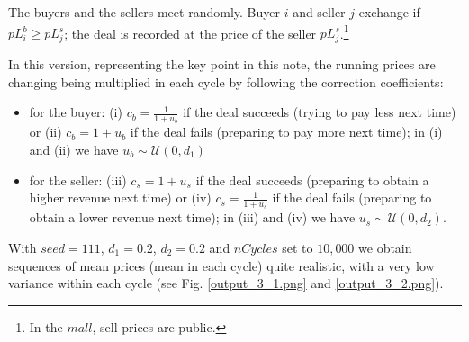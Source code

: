 \documentclass[12pt]{report}
\begin{document}
The buyers and the sellers meet randomly. Buyer $i$ and seller $j$ exchange if  $pL^b_i \geq pL^s_j$; the deal is recorded at the price of the seller $pL^s_j$.\footnote{In the $mall$, sell prices are public.}

In this version, representing the key point in this note, the running prices are changing being multiplied in each cycle by following the correction coefficients:

\begin{itemize}
\item for the buyer: (i) $c_b=\frac{1} {1 + u_b}$ if the deal succeeds (trying to pay less next time) or (ii) $c_b=1 + u_b$ if the deal fails (preparing to pay more next time); in (i) and (ii) we have $u_b\sim\mathcal{U}(0,d_1)$

\item for the seller: (iii) $c_s=1 + u_s$ if the deal succeeds (preparing to obtain a higher revenue next time) or (iv) $c_s=\frac{1} {1 + u_s}$  if the deal fails (preparing to obtain a lower revenue next time); in (iii) and (iv) we have $u_s\sim\mathcal{U}(0,d_2)$.
\end{itemize}

With $seed=111$, $d_1=0.2$, $d_2=0.2$ and $nCycles$ set to $10,000$ we obtain sequences of mean prices (mean in each cycle) quite realistic, with a very low variance within each cycle (see Fig. \ref{output_3_1.png} and \ref{output_3_2.png}).
\end{document}
